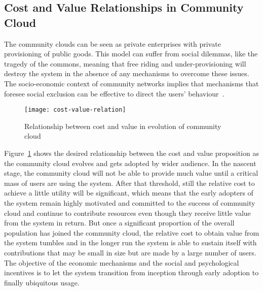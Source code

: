 


\subsection{Cost and Value Relationships in Community Cloud}
\label{sec:costs-value}

The community clouds can be seen as private enterprises with private provisioning of public goods.
This model can suffer from social dilemmas, like the tragedy of the commons, meaning that free riding and under-provisioning will destroy the system in the absence of any mechanisms to overcome these issues.
The socio-economic context of community networks implies that mechanisms that foresee social exclusion can be effective to direct the users' behaviour~\cite{Greiff2013}.


\begin{figure}[tbp]
	\centering
	\texttt{[image: cost-value-relation]}
	\caption{Relationship between cost and value in evolution of community cloud}
	\label{fig:cost-value-relation}
\end{figure}

Figure~\ref{fig:cost-value-relation} shows the desired relationship between the cost and value proposition as the community cloud evolves and gets adopted by wider audience.
In the nascent stage, the community cloud will not be able to provide much value until a critical mass of users are using the system.
After that threshold, still the relative cost to achieve a little utility will be significant, which means that the early adopters of the system remain highly motivated and committed to the success of community cloud and continue to contribute resources even though they receive little value from the system in return.
But once a significant proportion of the overall population has joined the community cloud, the relative cost to obtain value from the system tumbles and in the longer run the system is able to sustain itself with contributions that may be small in size but are made by a large number of users.
The objective of the economic mechanisms and the social and psychological incentives is to let the system transition from inception through early adoption to finally ubiquitous usage.


